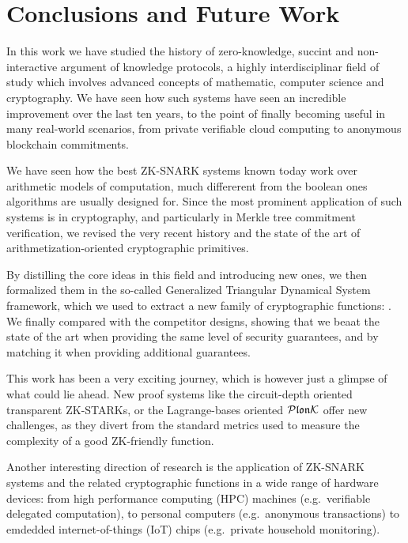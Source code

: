\chapter{Conclusions and Future Work}\label{chap:conclusions}
In this work we have studied the history of zero-knowledge, succint and non-interactive 
argument of knowledge protocols, a highly interdisciplinar field of study which involves advanced
concepts of mathematic, computer science and cryptography.
We have seen how such systems have seen an incredible improvement over the last ten years, to the 
point of finally becoming useful in many real-world scenarios, from private verifiable cloud 
computing to anonymous blockchain commitments.

We have seen how the best ZK-SNARK systems known today work over arithmetic models of 
computation, much differerent from the boolean ones algorithms are usually designed for.
Since the most prominent application of such systems is in cryptography, and particularly in 
Merkle tree commitment verification, we revised the very recent history and the state of the art of 
arithmetization-oriented cryptographic primitives.

By distilling the core ideas in this field and introducing new ones, we then formalized them in the 
so-called Generalized Triangular Dynamical System framework, which we used to extract a new family 
of cryptographic functions: \Arion.
We finally compared \Arion{} with the competitor designs, showing that we beaat the state of the 
art when providing the same level of security guarantees, and by matching it when providing 
additional guarantees.

This work has been a very exciting journey, which is however just a glimpse of what could lie ahead.
New proof systems like the circuit-depth oriented transparent ZK-STARKs, or the Lagrange-bases 
oriented \(\mathcal{P}\mathfrak{lon}\mathcal{K} \) offer new challenges, as they divert from the standard metrics used to measure 
the complexity of a good ZK-friendly function. 

Another interesting direction of research is the application of ZK-SNARK systems and the 
related cryptographic functions in a wide range of hardware devices: from high performance 
computing (HPC) machines (e.g.\ verifiable delegated computation), to personal computers 
(e.g.\ anonymous transactions) to emdedded internet-of-things (IoT) chips 
(e.g.\ private household monitoring). 
